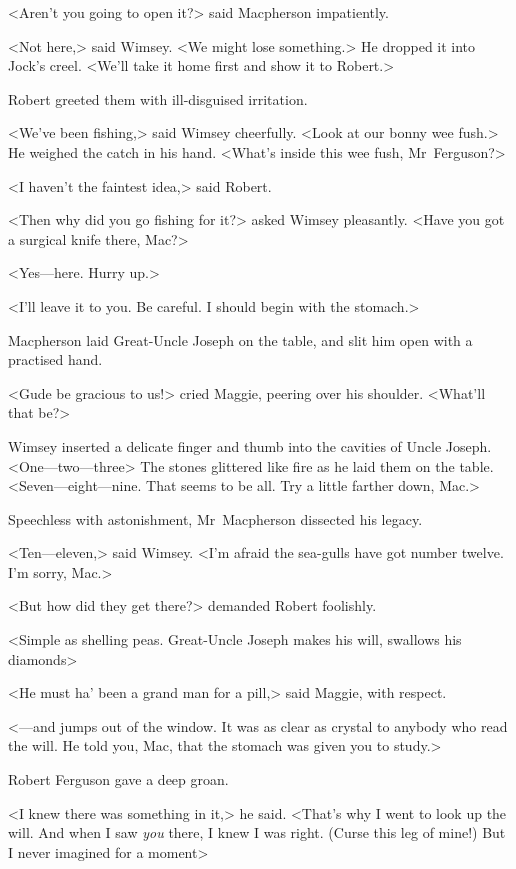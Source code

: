 <Aren't you going to open it?> said Macpherson impatiently.

<Not here,> said Wimsey. <We might lose something.> He dropped it into Jock's creel. <We'll take it home first and show it to Robert.>

Robert greeted them with ill-disguised irritation.

<We've been fishing,> said Wimsey cheerfully. <Look at our bonny wee fush.> He weighed the catch in his hand. <What's inside this wee fush, Mr~Ferguson?>

<I haven't the faintest idea,> said Robert.

<Then why did you go fishing for it?> asked Wimsey pleasantly. <Have you got a surgical knife there, Mac?>

<Yes—here. Hurry up.>

<I'll leave it to you. Be careful. I should begin with the stomach.>

Macpherson laid Great-Uncle Joseph on the table, and slit him open with a practised hand.

<Gude be gracious to us!> cried Maggie, peering over his shoulder. <What'll that be?>

Wimsey inserted a delicate finger and thumb into the cavities of Uncle Joseph. <One—two—three\longdash> The stones glittered like fire as he laid them on the table. <Seven—eight—nine. That seems to be all. Try a little farther down, Mac.>

Speechless with astonishment, Mr~Macpherson dissected his legacy.

<Ten—eleven,> said Wimsey. <I'm afraid the sea-gulls have got number twelve. I'm sorry, Mac.>

<But how did they get there?> demanded Robert foolishly.

<Simple as shelling peas. Great-Uncle Joseph makes his will, swallows his diamonds\longdash>

<He must ha' been a grand man for a pill,> said Maggie, with respect.

<—and jumps out of the window. It was as clear as crystal to anybody who read the will. He told you, Mac, that the stomach was given you to study.>

Robert Ferguson gave a deep groan.

<I knew there was something in it,> he said. <That's why I went to look up the will. And when I saw \textit{you} there, I knew I was right. (Curse this leg of mine!) But I never imagined for a moment\longdash>

